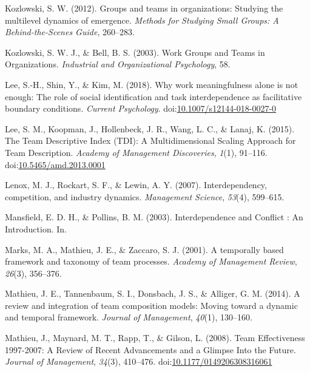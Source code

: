\documentclass[english,,man]{apa6}
\theoremstyle{definition}
\theoremstyle{definition}
\theoremstyle{definition}
\theoremstyle{remark}
\begin{document}
\leavevmode\hypertarget{ref-kozlowski_groups_2012}{}%
Kozlowski, S. W. (2012). Groups and teams in organizations: Studying the
multilevel dynamics of emergence. \emph{Methods for Studying Small
Groups: A Behind-the-Scenes Guide}, 260--283.

\leavevmode\hypertarget{ref-kozlowski_work_nodate}{}%
Kozlowski, S. W. J., \& Bell, B. S. (2003). Work Groups and Teams in
Organizations. \emph{Industrial and Organizational Psychology}, 58.

\leavevmode\hypertarget{ref-lee_why_2018}{}%
Lee, S.-H., Shin, Y., \& Kim, M. (2018). Why work meaningfulness alone
is not enough: The role of social identification and task
interdependence as facilitative boundary conditions. \emph{Current
Psychology}.
doi:\href{https://doi.org/10.1007/s12144-018-0027-0}{10.1007/s12144-018-0027-0}

\leavevmode\hypertarget{ref-lee_team_2015}{}%
Lee, S. M., Koopman, J., Hollenbeck, J. R., Wang, L. C., \& Lanaj, K.
(2015). The Team Descriptive Index (TDI): A Multidimensional Scaling
Approach for Team Description. \emph{Academy of Management Discoveries},
\emph{1}(1), 91--116.
doi:\href{https://doi.org/10.5465/amd.2013.0001}{10.5465/amd.2013.0001}

\leavevmode\hypertarget{ref-lenox_interdependency_2007}{}%
Lenox, M. J., Rockart, S. F., \& Lewin, A. Y. (2007). Interdependency,
competition, and industry dynamics. \emph{Management Science},
\emph{53}(4), 599--615.

\leavevmode\hypertarget{ref-mansfield_interdependence_2003}{}%
Mansfield, E. D. H., \& Pollins, B. M. (2003). Interdependence and
Conflict : An Introduction. In.

\leavevmode\hypertarget{ref-marks_temporally_2001}{}%
Marks, M. A., Mathieu, J. E., \& Zaccaro, S. J. (2001). A temporally
based framework and taxonomy of team processes. \emph{Academy of
Management Review}, \emph{26}(3), 356--376.

\leavevmode\hypertarget{ref-mathieu_review_2014}{}%
Mathieu, J. E., Tannenbaum, S. I., Donsbach, J. S., \& Alliger, G. M.
(2014). A review and integration of team composition models: Moving
toward a dynamic and temporal framework. \emph{Journal of Management},
\emph{40}(1), 130--160.

\leavevmode\hypertarget{ref-mathieu_team_2008}{}%
Mathieu, J., Maynard, M. T., Rapp, T., \& Gilson, L. (2008). Team
Effectiveness 1997-2007: A Review of Recent Advancements and a Glimpse
Into the Future. \emph{Journal of Management}, \emph{34}(3), 410--476.
doi:\href{https://doi.org/10.1177/0149206308316061}{10.1177/0149206308316061}
\end{document}
